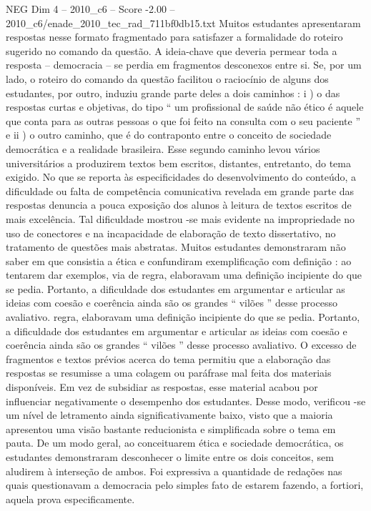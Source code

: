 \begin{textsample}{NEG Dim 4 – 2010\_c6 – Score -2.00 – 2010\_c6/enade\_2010\_tec\_rad\_711bf0db15.txt}
Muitos estudantes apresentaram respostas nesse formato fragmentado para satisfazer a formalidade do roteiro sugerido no comando da questão.
A ideia-chave que deveria permear toda a resposta – democracia – se perdia em fragmentos desconexos entre si.
Se, por um lado, o roteiro do comando da questão facilitou o raciocínio de alguns dos estudantes, por outro, induziu grande parte deles a dois caminhos : i ) o das respostas curtas e objetivas, do tipo “ um profissional de saúde não ético é aquele que conta para as outras pessoas o que foi feito na consulta com o seu paciente ” e ii ) o outro caminho, que é do contraponto entre o conceito de sociedade democrática e a realidade brasileira.
Esse segundo caminho levou vários universitários a produzirem textos bem escritos, distantes, entretanto, do tema exigido.
No que se reporta às especificidades do desenvolvimento do conteúdo, a dificuldade ou falta de competência comunicativa revelada em grande parte das respostas denuncia a pouca exposição dos alunos à leitura de textos escritos de mais excelência.
Tal dificuldade mostrou -se mais evidente na impropriedade no uso de conectores e na incapacidade de elaboração de texto dissertativo, no tratamento de questões mais abstratas.
Muitos estudantes demonstraram não saber em que consistia a ética e confundiram exemplificação com definição : ao tentarem dar exemplos, via de regra, elaboravam uma definição incipiente do que se pedia.
Portanto, a dificuldade dos estudantes em argumentar e articular as ideias com coesão e coerência ainda são os grandes “ vilões ” desse processo avaliativo. regra, elaboravam uma definição incipiente do que se pedia.
Portanto, a dificuldade dos estudantes em argumentar e articular as ideias com coesão e coerência ainda são os grandes “ vilões ” desse processo avaliativo.
O excesso de fragmentos e textos prévios acerca do tema permitiu que a elaboração das respostas se resumisse a uma colagem ou paráfrase mal feita dos materiais disponíveis.
Em vez de subsidiar as respostas, esse material acabou por influenciar negativamente o desempenho dos estudantes.
Desse modo, verificou -se um nível de letramento ainda significativamente baixo, visto que a maioria apresentou uma visão bastante reducionista e simplificada sobre o tema em pauta.
De um modo geral, ao conceituarem ética e sociedade democrática, os estudantes demonstraram desconhecer o limite entre os dois conceitos, sem aludirem à interseção de ambos.
Foi expressiva a quantidade de redações nas quais questionavam a democracia pelo simples fato de estarem fazendo, a fortiori, aquela prova especificamente.

\end{textsample}
